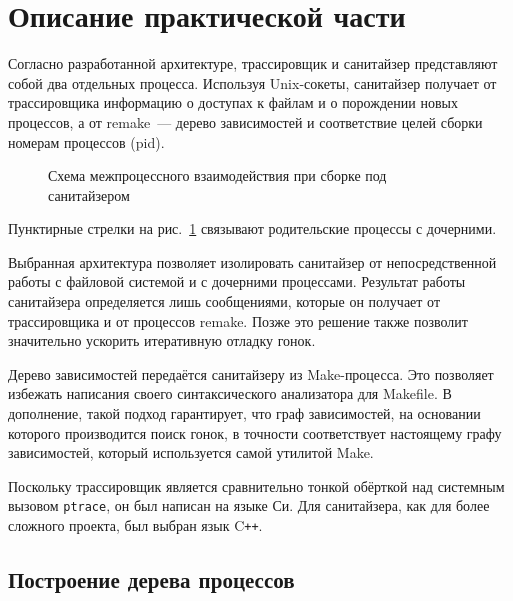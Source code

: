 \section{Описание практической части}
\label{sec:Chapter4} 


Согласно разработанной архитектуре, трассировщик и санитайзер представляют собой два отдельных процесса. Используя Unix-сокеты, санитайзер получает от трассировщика информацию о доступах к файлам и о порождении новых процессов, а от remake~--- дерево зависимостей и соответствие целей сборки номерам процессов (pid).

\begin{figure}[H]
    \centering
    
    \caption{Схема межпроцессного взаимодействия при сборке под санитайзером}
    \label{fig:parmasan-processes}
\end{figure}

Пунктирные стрелки на рис.~\ref{fig:parmasan-processes} связывают родительские процессы с дочерними.

Выбранная архитектура позволяет изолировать санитайзер от непосредственной работы с файловой системой и с дочерними процессами. Результат работы санитайзера определяется лишь сообщениями, которые он получает от трассировщика и от процессов remake. Позже это решение также позволит значительно ускорить итеративную отладку гонок.

Дерево зависимостей передаётся санитайзеру из Make-процесса. Это позволяет избежать написания своего синтаксического анализатора для Makefile. В дополнение, такой подход гарантирует, что граф зависимостей, на основании которого производится поиск гонок, в точности соответствует настоящему графу зависимостей, который используется самой утилитой Make.

Поскольку трассировщик является сравнительно тонкой обёрткой над системным вызовом \texttt{ptrace}, он был написан на языке Си. Для санитайзера, как для более сложного проекта, был выбран язык C\texttt{++}.

\subsection{Построение дерева процессов}
\label{subsec:pstree}

